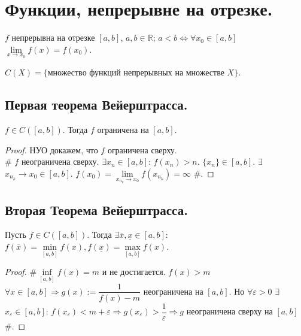 \documentclass[12pt]{article}
\begin{document}
	\section{Функции, непрерывне на отрезке.}
	\begin{definition}
		$f$ непрерывна на отрезке $[a, b]$, $a, b \in \mathbb{R}$; $a < b \Leftrightarrow \forall x_0 \in [a, b]$ $\lim\limits_{x \rightarrow x_0} f(x) = f(x_0)$.
	\end{definition}
	\begin{note}
		$C(X) = \{ \text{множество функций непрерывных на множестве } X \}$.
	\end{note}
	\subsection{Первая теорема Вейерштрасса.}
	\begin{theorem}
		$f \in C([a, b])$. Тогда $f$ ограничена на $[a, b]$.
	\end{theorem}
	\begin{proof}
		НУО докажем, что $f$ ограничена сверху. \\
		$\#$ $f$ неограничена сверху.	$\exists x_n \in [a, b]$: $f(x_n) > n$.	$\{ x_n \} \in [a, b]$. $\exists$ $x_{n_k} \rightarrow x_0 \in [a, b]$. $f(x_0) = \lim\limits_{x_{n_k} \rightarrow x_0} f(x_{n_k}) = \infty$ $\#$.
	\end{proof}
	\subsection{Вторая Теорема Вейерштрасса.}
	\begin{theorem}
		Пусть $f \in C([a, b])$. Тогда $\exists \overline{x}, \underline{x} \in [a, b]$: $f(\overline{x}) = \min\limits_{[a, b]} f(x), f(\underline{x}) = \max\limits_{[a, b]} f(x)$.
	\end{theorem}
	\begin{proof}
		$\# \inf\limits_{[a, b]} f(x) = m$ и не достигается. $f(x) > m$ $\forall x \in [a, b] \Rightarrow g(x) := \dfrac{1}{f(x) - m}$ неограничена на $[a, b]$. Но $\forall \varepsilon > 0$ $\exists$ $x_{\varepsilon} \in [a, b]$: $f(x_{\varepsilon}) < m + \varepsilon \Rightarrow g(x_{\varepsilon}) > \dfrac{1}{\varepsilon} \Rightarrow g$ неограничена сверху на $[a, b]$ $\#$.
	\end{proof}
\end{document}
